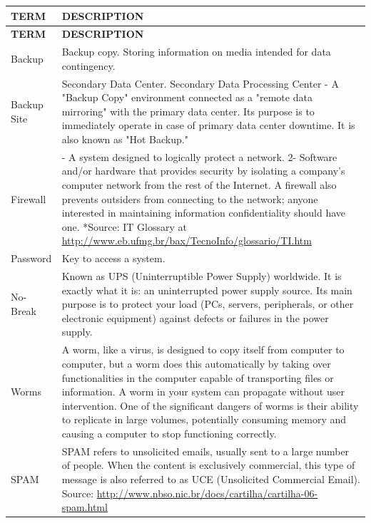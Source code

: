 \begin{longtable}{|>{\centering\arraybackslash}m{3cm}|>{\raggedright\arraybackslash}m{12cm}|}
\hline
\textbf{TERM} & \textbf{DESCRIPTION} \\
\hline
\endfirsthead

\hline
\textbf{TERM} & \textbf{DESCRIPTION} \\
\hline
\endhead

\hline
\endfoot

Backup & Backup copy. Storing information on media intended for data contingency. \\
\hline
Backup Site & Secondary Data Center. Secondary Data Processing Center - A "Backup Copy" environment connected as a "remote data mirroring" with the primary data center. Its purpose is to immediately operate in case of primary data center downtime. It is also known as "Hot Backup." \\
\hline
Firewall & 1- A system designed to logically protect a network. 2- Software and/or hardware that provides security by isolating a company's computer network from the rest of the Internet. A firewall also prevents outsiders from connecting to the network; anyone interested in maintaining information confidentiality should have one.  
*Source: IT Glossary at \url{http://www.eb.ufmg.br/bax/TecnoInfo/glossario/TI.htm} \\
\hline
Password & Key to access a system. \\
\hline
No-Break & Known as UPS (Uninterruptible Power Supply) worldwide. It is exactly what it is: an uninterrupted power supply source. Its main purpose is to protect your load (PCs, servers, peripherals, or other electronic equipment) against defects or failures in the power supply. \\
\hline
Worms & A worm, like a virus, is designed to copy itself from computer to computer, but a worm does this automatically by taking over functionalities in the computer capable of transporting files or information. A worm in your system can propagate without user intervention. One of the significant dangers of worms is their ability to replicate in large volumes, potentially consuming memory and causing a computer to stop functioning correctly. \\
\hline
SPAM & SPAM refers to unsolicited emails, usually sent to a large number of people. When the content is exclusively commercial, this type of message is also referred to as UCE (Unsolicited Commercial Email).  
Source: \url{http://www.nbso.nic.br/docs/cartilha/cartilha-06-spam.html} \\

\end{longtable}
